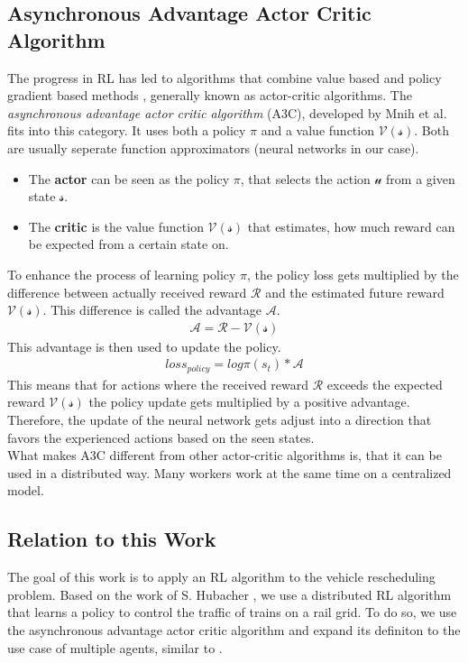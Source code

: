 \subsection*{Asynchronous Advantage Actor Critic Algorithm}\label{a3c_intro}
The progress in RL has led to algorithms that combine value based and policy gradient based methods , generally known as actor-critic algorithms. The \textit{asynchronous advantage actor critic algorithm} (A3C), developed by Mnih et al. \cite{a3c} fits into this category. It uses both a policy $\pi$ and a value function $\mathcal{V(s)}$.
Both are usually seperate function approximators (neural networks in our case).
\begin{itemize}
	\item The \textbf{actor} can be seen as the policy $\pi$, that selects the action $\mathcal{u}$ from a given state $\mathcal{s}$.
	\item The \textbf{critic} is the value function $\mathcal{V(s)}$ that estimates, how much reward can be expected from a certain state on.
\end{itemize}
To enhance the process of learning policy $\pi$, the policy loss gets multiplied by the difference between actually received reward $\mathcal{R}$ and the estimated future reward $\mathcal{V(s)}$. This difference is called the advantage $\mathcal{A}$.
\begin{gather*}
\mathcal{A}=\mathcal{R}-\mathcal{V(s)}
\end{gather*}
This advantage is then used to update the policy.
\begin{gather*}
loss_{policy}=log \pi(s_{t})*\mathcal{A}
\end{gather*}
This means that for actions where the received reward $\mathcal{R}$ exceeds the expected reward $\mathcal{V(s)}$ the policy update gets multiplied by a positive advantage. Therefore, the update of the neural network gets adjust into a direction that favors the experienced actions based on the seen states.\\
What makes A3C different from other actor-critic algorithms is, that it can be used in a distributed way. Many workers work at the same time on a centralized model.
\subsection*{Relation to this Work}\label{rl_relation_work}
The goal of this work is to apply an RL algorithm to the vehicle rescheduling problem. Based on the work of S. Hubacher \cite{flatlandstephan}, we use a distributed RL algorithm that learns a policy to control the traffic of trains on a rail grid. To do so, we use the asynchronous advantage actor critic algorithm \cite{a3c} and expand its definiton to the use case of multiple agents, similar to \cite{marltraffica3c}.

